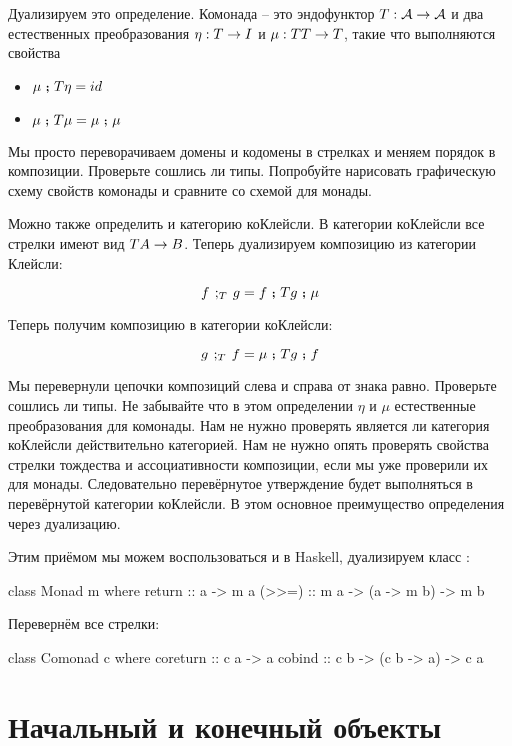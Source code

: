 Дуализируем это определение. Комонада -- это эндофунктор
$T : \mathcal{A} \rightarrow \mathcal{A}$ и два естественных преобразования
$\eta : T \rightarrow I$ и $\mu : TT \rightarrow T$, такие что  выполняются
свойства
\begin{itemize}
\item $\mu \footnotesize\textbf{~;~}\normalsize T \eta = id$
\item $\mu \footnotesize\textbf{~;~}\normalsize T \mu = \mu \footnotesize\textbf{~;~}\normalsize \mu$
\end{itemize}

Мы просто переворачиваем домены и кодомены в стрелках и
меняем порядок в композиции. Проверьте сошлись ли типы. 
Попробуйте нарисовать графическую схему свойств комонады 
и сравните со схемой для монады. 

Можно также определить и категорию коКлейсли.
В категории коКлейсли все стрелки имеют вид $TA \rightarrow B$. 
Теперь дуализируем композицию из категории Клейсли:

\[ f \textbf{~$;_{T}$~} g = f \footnotesize\textbf{~;~}\normalsize Tg \footnotesize\textbf{~;~}\normalsize \mu \]

Теперь получим композицию в категории коКлейсли:

\[ g \textbf{~$;_{T}$~} f = \mu \footnotesize\textbf{~;~}\normalsize Tg \footnotesize\textbf{~;~}\normalsize f \]

Мы перевернули цепочки композиций слева и справа от знака
равно. Проверьте сошлись ли типы. Не забывайте что в
этом определении $\eta$ и $\mu$ естественные преобразования
для комонады. Нам не нужно проверять является ли
категория коКлейсли действительно категорией. Нам
не нужно опять проверять свойства стрелки тождества и 
ассоциативности композиции, если мы уже проверили их для монады.
Следовательно перевёрнутое утверждение будет выполняться
в перевёрнутой категории коКлейсли. В этом основное 
преимущество определения через дуализацию. 

Этим приёмом мы можем воспользоваться и в Haskell, 
дуализируем класс :

\begin{code}
class Monad m where
    return  :: a -> m a
    (>>=)   :: m a -> (a -> m b) -> m b
\end{code}

Перевернём все стрелки:

\begin{code}
class Comonad c where
    coreturn    :: c a -> a
    cobind      :: c b -> (c b -> a) -> c a
\end{code}

\section{Начальный и конечный объекты}

